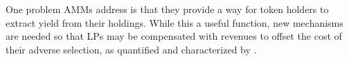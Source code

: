 \documentclass[11pt, reqno]{amsart}
\theoremstyle{definition}
\theoremstyle{remark}
\newcommand{\tA}{\textnormal{\texttt{A}}}
\newcommand{\tB}{\textnormal{\texttt{B}}}
\begin{document}
One problem AMMs address is that they provide a way for token holders to
extract yield from their holdings. While this a useful function, new
mechanisms are needed so that LPs may be compensated with revenues to
offset the cost of their adverse selection, as quantified and characterized
by \cite{MiMoRoZh22}.


%
%
%
\end{document}
